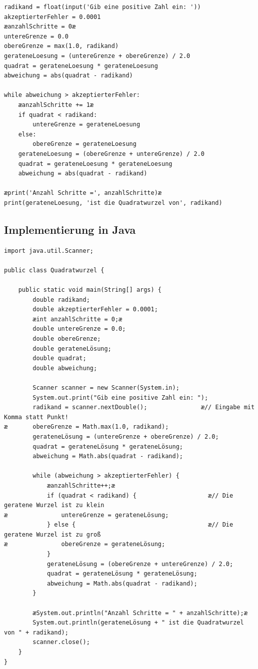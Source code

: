 \begin{lstlisting}
radikand = float(input('Gib eine positive Zahl ein: '))
akzeptierterFehler = 0.0001
æanzahlSchritte = 0æ
untereGrenze = 0.0
obereGrenze = max(1.0, radikand)
gerateneLoesung = (untereGrenze + obereGrenze) / 2.0
quadrat = gerateneLoesung * gerateneLoesung
abweichung = abs(quadrat - radikand)

while abweichung > akzeptierterFehler:
    æanzahlSchritte += 1æ
    if quadrat < radikand:
        untereGrenze = gerateneLoesung
    else:
        obereGrenze = gerateneLoesung
    gerateneLoesung = (obereGrenze + untereGrenze) / 2.0
    quadrat = gerateneLoesung * gerateneLoesung
    abweichung = abs(quadrat - radikand)

æprint('Anzahl Schritte =', anzahlSchritte)æ
print(gerateneLoesung, 'ist die Quadratwurzel von', radikand)
\end{lstlisting}

\clearpage

\subsection{Implementierung in Java}

\begin{lstlisting}
import java.util.Scanner;

public class Quadratwurzel {

	public static void main(String[] args) {
		double radikand;
		double akzeptierterFehler = 0.0001;
		æint anzahlSchritte = 0;æ
		double untereGrenze = 0.0;
		double obereGrenze;
		double gerateneLösung;
		double quadrat;
		double abweichung;

		Scanner scanner = new Scanner(System.in);
		System.out.print("Gib eine positive Zahl ein: ");
		radikand = scanner.nextDouble();               æ// Eingabe mit Komma statt Punkt! 
æ		obereGrenze = Math.max(1.0, radikand);
		gerateneLösung = (untereGrenze + obereGrenze) / 2.0;
		quadrat = gerateneLösung * gerateneLösung;
		abweichung = Math.abs(quadrat - radikand);

		while (abweichung > akzeptierterFehler) {
			æanzahlSchritte++;æ
			if (quadrat < radikand) {                    æ// Die geratene Wurzel ist zu klein
æ				untereGrenze = gerateneLösung;
			} else {                                     æ// Die geratene Wurzel ist zu groß
æ				obereGrenze = gerateneLösung;
			}
			gerateneLösung = (obereGrenze + untereGrenze) / 2.0;
			quadrat = gerateneLösung * gerateneLösung;
			abweichung = Math.abs(quadrat - radikand);
		}

		æSystem.out.println("Anzahl Schritte = " + anzahlSchritte);æ
		System.out.println(gerateneLösung + " ist die Quadratwurzel von " + radikand);
		scanner.close();
	}
}
\end{lstlisting}

